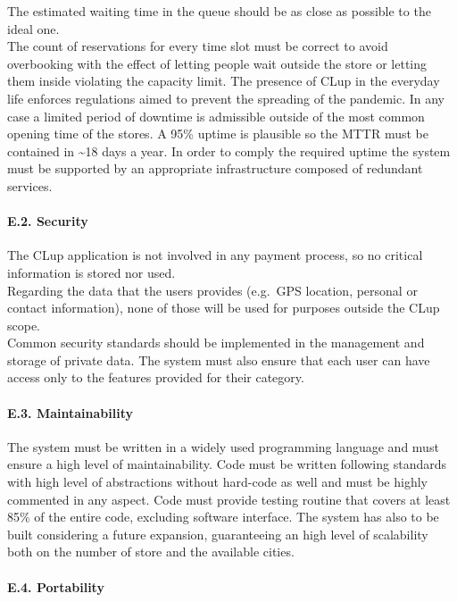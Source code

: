 The estimated waiting time in the queue should be as close as possible
to the ideal one.\\
The count of reservations for every time slot must be correct to avoid
overbooking with the effect of letting people wait outside the store or
letting them inside violating the capacity limit. The presence of CLup
in the everyday life enforces regulations aimed to prevent the spreading
of the pandemic. In any case a limited period of downtime is admissible
outside of the most common opening time of the stores. A 95\% uptime is
plausible so the MTTR must be contained in \textasciitilde18 days a
year. In order to comply the required uptime the system must be
supported by an appropriate infrastructure composed of redundant
services.

\hypertarget{e.2.-security}{%
\paragraph{E.2. Security}\label{e.2.-security}}

The CLup application is not involved in any payment process, so no
critical information is stored nor used.\\
Regarding the data that the users provides (e.g.~GPS location, personal
or contact information), none of those will be used for purposes outside
the CLup scope.\\
Common security standards should be implemented in the management and
storage of private data. The system must also ensure that each user can
have access only to the features provided for their category.

\hypertarget{e.3.-maintainability}{%
\paragraph{E.3. Maintainability}\label{e.3.-maintainability}}

The system must be written in a widely used programming language and
must ensure a high level of maintainability. Code must be written
following standards with high level of abstractions without hard-code as
well and must be highly commented in any aspect. Code must provide
testing routine that covers at least 85\% of the entire code, excluding
software interface. The system has also to be built considering a future
expansion, guaranteeing an high level of scalability both on the number
of store and the available cities.

\hypertarget{e.4.-portability}{%
\paragraph{E.4. Portability}\label{e.4.-portability}}

